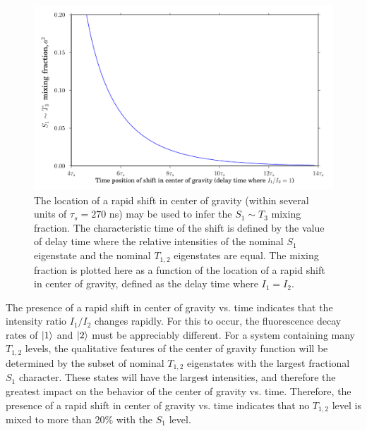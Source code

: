 \begin{figure}
  \caption{The location of a rapid shift in center of gravity (within
    several units of $\tau_s = 270$ ns) may be used to infer the $S_1
    \sim T_3$ mixing fraction.  The characteristic time of the shift
    is defined by the value of delay time where the relative
    intensities of the nominal $S_1$ eigenstate and the nominal
    $T_{1,2}$ eigenstates are equal.  The mixing fraction is plotted
    here as a function of the location of a rapid shift in center of
    gravity, defined as the delay time where $I_1 = I_2$.}
  \label{fig:cog-inflection-point}

  \centering
  \includegraphics[width=6in]{cog-inflection-point.pdf}
\end{figure}

The presence of a rapid shift in center of gravity vs. time indicates
that the intensity ratio $I_1/I_2$ changes rapidly.  For this to
occur, the fluorescence decay rates of $\mathinner{|{1}\rangle}$ and $\mathinner{|{2}\rangle}$ must be
appreciably different.  For a system containing many $T_{1,2}$ levels,
the qualitative features of the center of gravity function will be
determined by the subset of nominal $T_{1,2}$ eigenstates with the
largest fractional $S_1$ character.  These states will have the
largest intensities, and therefore the greatest impact on the
behavior of the center of gravity vs. time.  Therefore, the presence
of a rapid shift in center of gravity vs. time indicates that no
$T_{1,2}$ level is mixed to more than 20\% with the $S_1$ level.

